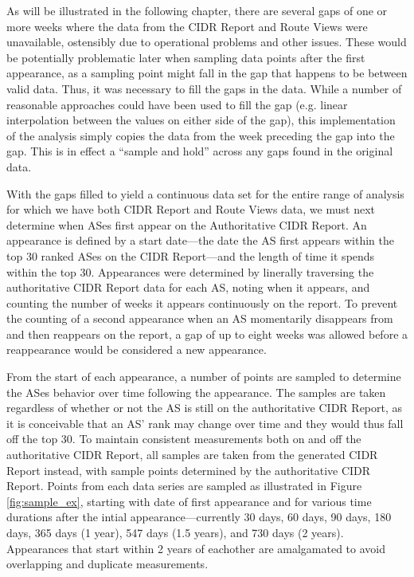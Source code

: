 As will be illustrated in the following chapter, there are several gaps of one or more weeks where the data from the CIDR Report and Route Views were unavailable, ostensibly due to operational problems and other issues. These would be potentially problematic later when sampling data points after the first appearance, as a sampling point might fall in the gap that happens to be between valid data. Thus, it was necessary to fill the gaps in the data. While a number of reasonable approaches could have been used to fill the gap (e.g. linear interpolation between the values on either side of the gap), this implementation of the analysis simply copies the data from the week preceding the gap into the gap. This is in effect a ``sample and hold'' across any gaps found in the original data.

With the gaps filled to yield a continuous data set for the entire range of analysis for which we have both CIDR Report and Route Views data, we must next determine when ASes first appear on the Authoritative CIDR Report. An appearance is defined by a start date---the date the AS first appears within the top 30 ranked ASes on the CIDR Report---and the length of time it spends within the top 30. Appearances were determined by linerally traversing the authoritative CIDR Report data for each AS, noting when it appears, and counting the number of weeks it appears continuously on the report. To prevent the counting of a second appearance when an AS momentarily disappears from and then reappears on the report, a gap of up to eight weeks was allowed before a reappearance would be considered a new appearance.

From the start of each appearance, a number of points are sampled to determine the ASes behavior over time following the appearance. The samples are taken regardless of whether or not the AS is still on the authoritative CIDR Report, as it is conceivable that an AS' rank may change over time and they would thus fall off the top 30. To maintain consistent measurements both on and off the authoritative CIDR Report, all samples are taken from the generated CIDR Report instead, with sample points determined by the authoritative CIDR Report. Points from each data series are sampled as illustrated in Figure \ref{fig:sample_ex}, starting with date of first appearance and for various time durations after the intial appearance---currently 30 days, 60 days, 90 days, 180 days, 365 days (1 year), 547 days (1.5 years), and 730 days (2 years). Appearances that start within 2 years of eachother are amalgamated to avoid overlapping and duplicate measurements.

